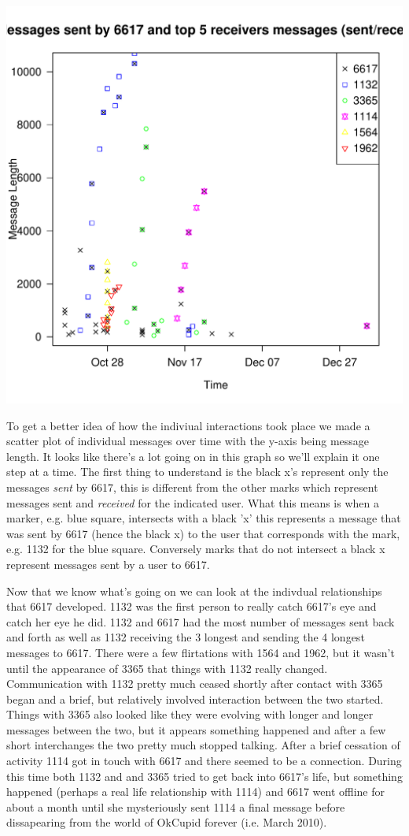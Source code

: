 \documentclass[a4paper,12pt]{article}
\begin{document}
\includegraphics[scale=.75]{p2/usermess.pdf}

To get a better idea of how the indiviual interactions took place we made a scatter plot of individual messages over time with the y-axis being message length.  It looks like there's a lot going on in this graph so we'll explain it one step at a time.  The first thing to understand is the black x's represent only the messages \emph{sent} by 6617, this is different from the other marks which represent messages sent and \emph{received} for the indicated user.  What this means is when a marker, e.g. blue square, intersects with a black 'x' this represents a message that was sent by 6617 (hence the black x) to the user that corresponds with the mark, e.g. 1132 for the blue square.  Conversely marks that do not intersect a black x represent messages sent by a user to 6617.  

Now that we know what's going on we can look at the indivdual relationships that 6617 developed.  1132 was the first person to really catch 6617's eye and catch her eye he did.  1132 and 6617 had the most number of messages sent back and forth as well as 1132 receiving the 3 longest and sending the 4 longest messages to 6617.  There were a few flirtations with 1564 and 1962, but it wasn't until the appearance of 3365 that things with 1132 really changed.  Communication with 1132 pretty much ceased shortly after contact with 3365 began and a brief, but relatively involved interaction between the two started.  Things with 3365 also looked like they were evolving with longer and longer messages between the two, but it appears something happened and after a few short interchanges the two pretty much stopped talking.  After a brief cessation of activity 1114 got in touch with 6617 and there seemed to be a connection.  During this time both 1132 and and 3365 tried to get back into 6617's life, but something happened (perhaps a real life relationship with 1114) and 6617 went offline for about a month until she mysteriously sent 1114 a final message before dissapearing from the world of OkCupid forever (i.e. March 2010).
\end{document}
